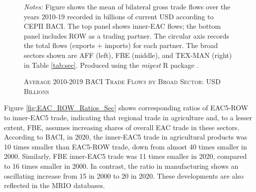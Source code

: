 \documentclass[a4paper]{article}
\begin{document}
\begin{figure}[h!] 
\centering
\caption{\label{fig:MIG_SEC_BACI}\textsc{Average 2010-2019 BACI Trade Flows by Broad Sector: USD Billions}}
\vspace{2mm}
\raggedright
\scriptsize 
\emph{Notes:} Figure shows the mean of bilateral gross trade flows over the years 2010-19 recorded in billions of current USD according to CEPII BACI. The top panel shows inner-EAC flows; the bottom panel includes ROW as a trading partner. The circular axis records the total flows (exports + imports) for each partner. The broad sectors shown are AFF (left), FBE (middle), and TEX-MAN (right) in Table \ref{tab:sec}. Produced using the \emph{migest} R package \citep{rmigest}.
\end{figure}
\FloatBarrier

Figure \ref{fig:EAC_ROW_Ratios_Sec} shows corresponding ratios of EAC5-ROW to inner-EAC5 trade, indicating that regional trade in agriculture and, to a lesser extent, FBE, assumes increasing shares of overall EAC trade in these sectors. According to BACI, in 2020, the inner-EAC5 trade in agricultural products was 10 times smaller than EAC5-ROW trade, down from almost 40 times smaller in 2000. Similarly, FBE inner-EAC5 trade was 11 times smaller in 2020, compared to 16 times smaller in 2000. In contrast, the ratio in manufacturing shows an oscillating increase from 15 in 2000 to 20 in 2020. These developments are also reflected in the MRIO databases. 
\end{document}
